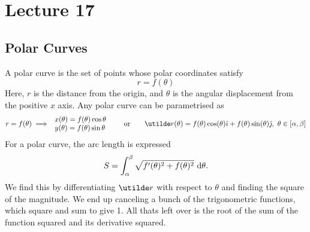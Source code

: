 \documentclass{report}
\begin{document}


\section{Lecture 17}
\subsection*{Polar Curves}
A polar curve is the set of points whose polar coordinates satisfy
$$
	r = f(\theta)
$$
Here, $r$ is the distance from the origin, and $\theta$ is the angular displacement from the positive $x$ axis. Any polar curve can be parametrised as
$$
	r = f(\theta) \implies \begin{array}{l} x(\theta) = f(\theta)\cos\theta \\ y(\theta) = f(\theta)\sin\theta \end{array}\qquad\text{or}\qquad \ut{r}(\theta) = f(\theta)\cos(\theta)\ihat + f(\theta)\sin(\theta)\jhat,\ \theta\in[\alpha,\beta]
$$
For a polar curve, the arc length is expressed
$$
	S = \int_\alpha^\beta \sqrt{f'(\theta)^2 + f(\theta)^2}\ \mathrm{d}\theta.
$$
We find this by differentiating $\ut{r}$ with respect to $\theta$ and finding the square of the magnitude. We end up canceling a bunch of the trigonometric functions, which square and sum to give 1. All thats left over is the root of the sum of the function squared and its derivative squared.
\end{document}
